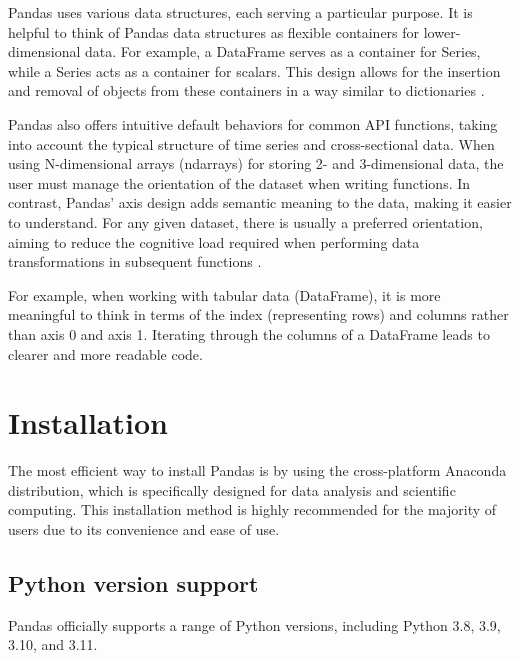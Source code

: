 Pandas uses various data structures, each serving a particular purpose. It is helpful to think of Pandas data structures as flexible containers for lower-dimensional data. For example, a DataFrame serves as a container for Series, while a Series acts as a container for scalars. This design allows for the insertion and removal of objects from these containers in a way similar to dictionaries \cite{McKinney:2015}.

Pandas also offers intuitive default behaviors for common API functions, taking into account the typical structure of time series and cross-sectional data. When using N-dimensional arrays (ndarrays) for storing 2- and 3-dimensional data, the user must manage the orientation of the dataset when writing functions. In contrast, Pandas' axis design adds semantic meaning to the data, making it easier to understand. For any given dataset, there is usually a preferred orientation, aiming to reduce the cognitive load required when performing data transformations in subsequent functions \cite{McKinney:2012}.

For example, when working with tabular data (DataFrame), it is more meaningful to think in terms of the index (representing rows) and columns rather than axis 0 and axis 1. Iterating through the columns of a DataFrame leads to clearer and more readable code.

\begin{code}[h!]
	    
	
	\caption{Columns of DataFrame}
	
\end{code}

\section{Installation}

The most efficient way to install Pandas is by using the cross-platform Anaconda distribution, which is specifically designed for data analysis and scientific computing. This installation method is highly recommended for the majority of users due to its convenience and ease of use.

\subsection{Python version support}

Pandas officially supports a range of Python versions, including Python 3.8, 3.9, 3.10, and 3.11.

